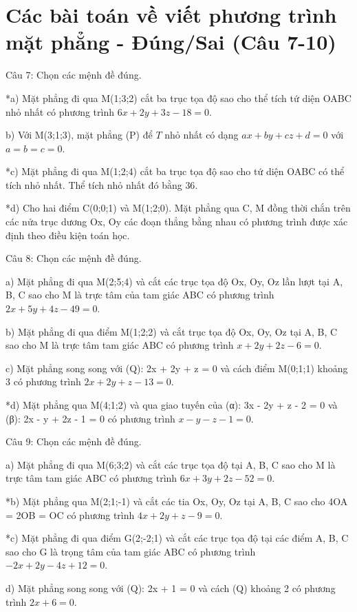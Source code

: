 \documentclass[a4paper,12pt]{article}
\begin{document}
\section*{Các bài toán về viết phương trình mặt phẳng - Đúng/Sai (Câu 7-10)}

Câu 7: Chọn các mệnh đề đúng.

*a) Mặt phẳng đi qua M(1;3;2) cắt ba trục tọa độ sao cho thể tích tứ diện OABC nhỏ nhất có phương trình \(6x + 2y + 3z - 18 = 0\).

b) Với M(3;1;3), mặt phẳng (P) để \(T\) nhỏ nhất có dạng \(ax+by+cz+d=0\) với \(a=b=c=0\).

*c) Mặt phẳng đi qua M(1;2;4) cắt ba trục tọa độ sao cho tứ diện OABC có thể tích nhỏ nhất. Thể tích nhỏ nhất đó bằng \(36\).

*d) Cho hai điểm C(0;0;1) và M(1;2;0). Mặt phẳng qua C, M đồng thời chắn trên các nửa trục dương Ox, Oy các đoạn thẳng bằng nhau có phương trình được xác định theo điều kiện toán học.



Câu 8: Chọn các mệnh đề đúng.

a) Mặt phẳng đi qua M(2;5;4) và cắt các trục tọa độ Ox, Oy, Oz lần lượt tại A, B, C sao cho M là trực tâm của tam giác ABC có phương trình \(2x + 5y + 4z - 49 = 0\).

b) Mặt phẳng đi qua điểm M(1;2;2) và cắt trục tọa độ Ox, Oy, Oz tại A, B, C sao cho M là trực tâm tam giác ABC có phương trình \(x + 2y + 2z - 6 = 0\).

c) Mặt phẳng song song với (Q): 2x + 2y + z = 0 và cách điểm M(0;1;1) khoảng 3 có phương trình \(2x + 2y + z - 13 = 0\).

*d) Mặt phẳng qua M(4;1;2) và qua giao tuyến của (α): 3x - 2y + z - 2 = 0 và (β): 2x - y + 2z - 1 = 0 có phương trình \(x - y - z - 1 = 0\).



Câu 9: Chọn các mệnh đề đúng.

a) Mặt phẳng đi qua M(6;3;2) và cắt các trục tọa độ tại A, B, C sao cho M là trực tâm tam giác ABC có phương trình \(6x + 3y + 2z - 52 = 0\).

*b) Mặt phẳng qua M(2;1;-1) và cắt các tia Ox, Oy, Oz tại A, B, C sao cho 4OA = 2OB = OC có phương trình \(4x + 2y + z - 9 = 0\).

*c) Mặt phẳng đi qua điểm G(2;-2;1) và cắt các trục tọa độ tại các điểm A, B, C sao cho G là trọng tâm của tam giác ABC có phương trình \(-2x + 2y - 4z + 12 = 0\).

d) Mặt phẳng song song với (Q): 2x + 1 = 0 và cách (Q) khoảng 2 có phương trình \(2x + 6 = 0\).
\end{document}
